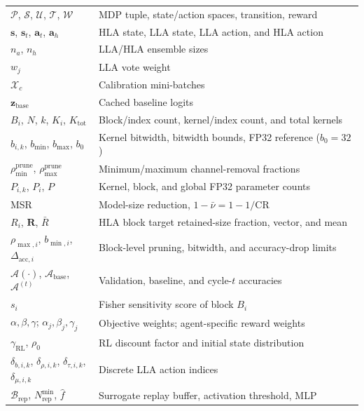 \documentclass[preprint,12pt,authoryear]{elsarticle}
\begin{document}
\begin{table}[htbp]
\begin{center}
\begin{tabular}{p{0.25\linewidth}p{0.75\linewidth}}
            $\mathcal{P}$, $\mathcal{S}$, $\mathcal{U}$, $\mathcal{T}$, $\mathcal{W}$ & MDP tuple, state/action spaces, transition, reward \\
            $\mathbf{s}$, $\mathbf{s}_t$, $\mathbf{a}_t$, $\mathbf{a}_h$ & HLA state, LLA state, LLA action, and HLA action \\
            $n_a$, $n_h$ & LLA/HLA ensemble sizes \\
            $w_j$ & LLA vote weight \\
            $\mathcal{X}_c$ & Calibration mini-batches \\ 
            $\mathbf{z}_{\mathrm{base}}$ & Cached baseline logits \\            
            $B_i$, $N$, $k$, $K_i$, $K_{\mathrm{tot}}$ & Block/index count, kernel/index count, and total kernels \\
            $b_{i,k}$, $b_{\min}$, $b_{\max}$, $b_0$ & Kernel bitwidth, bitwidth bounds, FP32 reference ($b_0=32$) \\
            $\rho_{\min}^{\mathrm{prune}}$, $\rho_{\max}^{\mathrm{prune}}$ & Minimum/maximum channel-removal fractions \\
            $P_{i,k}$, $P_i$, $P$ & Kernel, block, and global FP32 parameter counts \\
            MSR & Model-size reduction, $1-\bar{\nu}=1-1/\mathrm{CR}$ \\
            $R_i$, $\mathbf{R}$, $\bar{R}$ & HLA block target retained-size fraction, vector, and mean \\
            $\rho_{\max,i}$, $b_{\min,i}$, $\Delta_{\mathrm{acc},i}$ & Block-level pruning, bitwidth, and accuracy-drop limits \\
            $\mathcal{A}(\cdot)$, $\mathcal{A}_{\mathrm{base}}$, $\mathcal{A}^{(t)}$ & Validation, baseline, and cycle-$t$ accuracies \\
            $s_i$ & Fisher sensitivity score of block $B_i$ \\
            $\alpha,\beta,\gamma$; $\alpha_j,\beta_j,\gamma_j$ & Objective weights; agent-specific reward weights \\
            $\gamma_{\mathrm{RL}}$, $\rho_0$ & RL discount factor and initial state distribution \\
            $\delta_{b,i,k}$, $\delta_{\rho,i,k}$, $\delta_{\tau,i,k}$, $\delta_{\mu,i,k}$ & Discrete LLA action indices \\
            $\mathcal{B}_{\mathrm{rep}}$, $N_{\mathrm{rep}}^{\min}$, $\hat{f}$ & Surrogate replay buffer, activation threshold, MLP \\
            \bottomrule
        \end{tabular}
    \end{center}
\end{table}
\end{document}

